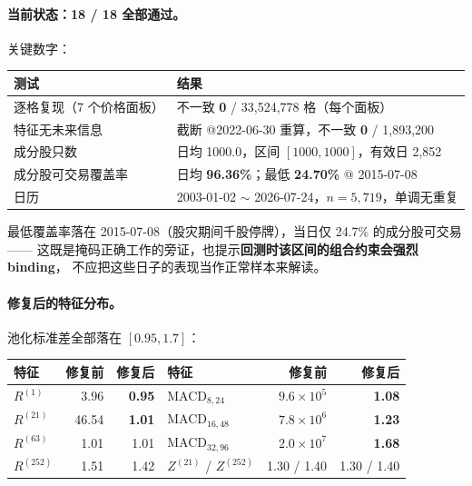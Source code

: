 \documentclass[11pt, a4paper]{ctexart}
\begin{document}
\paragraph{当前状态：18 / 18 全部通过。}关键数字：

\begin{table}[h]
\centering
\small
\begin{tabular}{lp{9.6cm}}
\toprule
测试 & 结果 \\
\midrule
逐格复现（7 个价格面板） & 不一致 \textbf{0} / 33{,}524{,}778 格（每个面板） \\
特征无未来信息 & 截断 @2022-06-30 重算，不一致 \textbf{0} / 1{,}893{,}200 \\
成分股只数 & 日均 1000.0，区间 $[1000, 1000]$，有效日 2{,}852 \\
成分股可交易覆盖率 & 日均 \textbf{96.36\%}；最低 \textbf{24.70\%} @ 2015-07-08 \\
日历 & 2003-01-02 $\sim$ 2026-07-24，$n=5{,}719$，单调无重复 \\
\bottomrule
\end{tabular}
\end{table}

\noindent
最低覆盖率落在 2015-07-08（股灾期间千股停牌），当日仅 24.7\% 的成分股可交易——
这既是掩码正确工作的旁证，也提示\textbf{回测时该区间的组合约束会强烈 binding}，
不应把这些日子的表现当作正常样本来解读。

\paragraph{修复后的特征分布。}池化标准差全部落在 $[0.95, 1.7]$：

\begin{table}[h]
\centering
\small
\begin{tabular}{lrr|lrr}
\toprule
特征 & 修复前 & 修复后 & 特征 & 修复前 & 修复后 \\
\midrule
$R^{(1)}$   & 3.96 & \textbf{0.95} & MACD$_{8,24}$   & $9.6\times10^5$ & \textbf{1.08} \\
$R^{(21)}$  & 46.54 & \textbf{1.01} & MACD$_{16,48}$  & $7.8\times10^6$ & \textbf{1.23} \\
$R^{(63)}$  & 1.01 & 1.01 & MACD$_{32,96}$  & $2.0\times10^7$ & \textbf{1.68} \\
$R^{(252)}$ & 1.51 & 1.42 & $Z^{(21)}$ / $Z^{(252)}$ & 1.30 / 1.40 & 1.30 / 1.40 \\
\bottomrule
\end{tabular}
\end{table}
\end{document}
